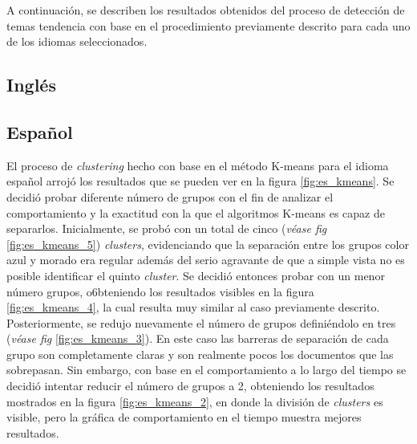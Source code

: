 A continuación, se describen los resultados obtenidos del proceso de detección de temas tendencia con base en el procedimiento previamente descrito para cada uno de los idiomas seleccionados.

\subsection{Inglés}


\subsection{Español}

El proceso de \textit{clustering} hecho con base en el método K-means para el idioma español arrojó los resultados que se pueden ver en la figura \ref{fig:es_kmeans}. Se decidió probar diferente número de grupos con el fin de analizar el comportamiento y la exactitud con la que el algoritmos K-means es capaz de separarlos. Inicialmente, se probó con un total de cinco (\textit{véase fig} \ref{fig:es_kmeans_5}) \textit{clusters}, evidenciando que la separación entre los grupos color azul y morado era regular además del serio agravante de que a simple vista no es posible identificar el quinto \textit{cluster}. Se decidió entonces probar con un menor número grupos, o6bteniendo los resultados visibles en la figura \ref{fig:es_kmeans_4}, la cual resulta muy similar al caso previamente descrito.\\

Posteriormente, se redujo nuevamente el número de grupos definiéndolo en tres (\textit{véase fig} \ref{fig:es_kmeans_3}). En este caso las barreras de separación de cada grupo son completamente claras y son realmente pocos los documentos que las sobrepasan. Sin embargo, con base en el comportamiento a lo largo del tiempo se decidió intentar reducir el número de grupos a 2, obteniendo los resultados mostrados en la figura \ref{fig:es_kmeans_2}, en donde la división de \textit{clusters} es visible, pero la gráfica de comportamiento en el tiempo muestra mejores resultados.\\

